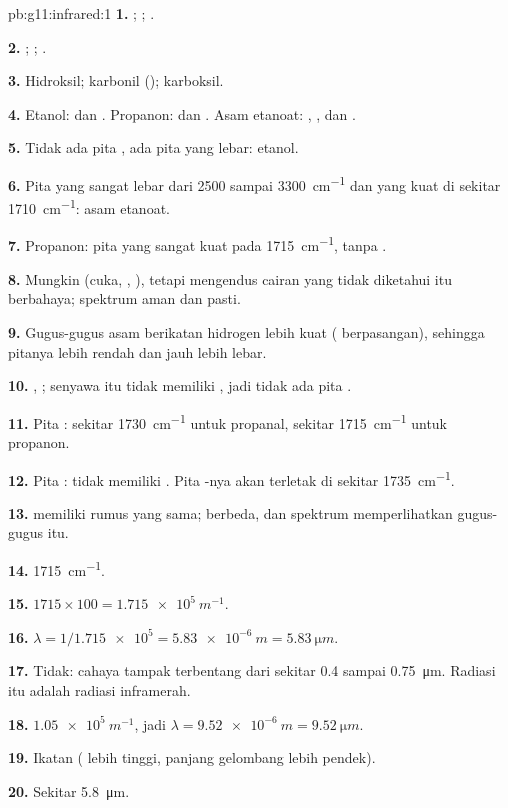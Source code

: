 \begin{solution}{pb:g11:infrared:1}
\textbf{1.} ; ; .

\textbf{2.} ; ; .

\textbf{3.} Hidroksil; karbonil (); karboksil.

\textbf{4.} Etanol:  dan . Propanon:  dan
. Asam etanoat: , , dan .

\textbf{5.} Tidak ada pita , ada pita  yang lebar:
etanol.

\textbf{6.} Pita  yang sangat lebar dari 2500 sampai
\qty{3300}{cm^{-1}} dan  yang kuat di sekitar
\qty{1710}{cm^{-1}}: asam etanoat.

\textbf{7.} Propanon: pita  yang sangat kuat pada
\qty{1715}{cm^{-1}}, tanpa .

\textbf{8.} Mungkin (cuka, , ), tetapi mengendus cairan
yang tidak diketahui itu berbahaya; spektrum aman dan pasti.

\textbf{9.} Gugus-gugus  asam berikatan hidrogen lebih kuat
( berpasangan), sehingga pitanya lebih rendah dan
jauh lebih lebar.

\textbf{10.} , ; senyawa itu tidak memiliki
, jadi tidak ada pita .

\textbf{11.} Pita : sekitar \qty{1730}{cm^{-1}} untuk propanal,
sekitar \qty{1715}{cm^{-1}} untuk propanon.

\textbf{12.} Pita :  tidak memiliki . Pita
-nya akan terletak di sekitar \qty{1735}{cm^{-1}}.

\textbf{13.}  memiliki rumus yang sama; 
berbeda, dan spektrum memperlihatkan gugus-gugus itu.

\textbf{14.} \qty{1715}{cm^{-1}}.

\textbf{15.} $1715 \times 100 = \qty{1.715e5}{m^{-1}}$.

\textbf{16.} $\lambda = 1/\num{1.715e5} = \qty{5.83e-6}{m} =
\qty{5.83}{\micro m}$.

\textbf{17.} Tidak: cahaya tampak terbentang dari sekitar 0.4 sampai
\qty{0.75}{\micro m}. Radiasi itu adalah radiasi inframerah.

\textbf{18.} $\num{1.05e5}\ \si{m^{-1}}$, jadi $\lambda = \qty{9.52e-6}{m}
= \qty{9.52}{\micro m}$.

\textbf{19.} Ikatan  ( lebih tinggi, panjang
gelombang lebih pendek).

\textbf{20.} Sekitar \qty{5.8}{\micro m}.
\end{solution}
